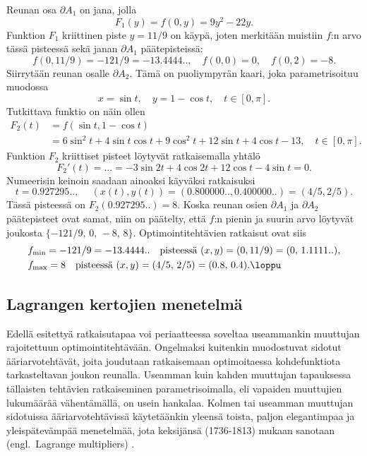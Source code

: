 Reunan osa $\partial A_1$ on jana, jolla
\[ 
F_1(y) = f(0,y) = 9y^2-22y. 
\]
Funktion $F_1$ kriittinen piste $y=11/9$ on käypä, joten merkitään muistiin $f$:n arvo tässä 
pisteessä sekä janan $\partial A_1$ päätepisteissä:
\[
f(0,11/9) = -121/9 = -13.4444.., \quad f(0,0)=0, \quad f(0,2) = -8. 
\]
Siirrytään reunan osalle $\partial A_2$. Tämä on puoliympyrän kaari, joka parametrisoituu 
muodossa
\[ 
x = \sin t, \quad y=1-\cos t, \quad t \in [0,\pi]. 
\]
Tutkittava funktio on näin ollen
\begin{align*}
 F_2(t) &= f(\sin t,1-\cos t) \\
        &= 6\sin^2t+4\sin t\cos t+9\cos^2 t+12\sin t+4\cos t-13, \quad t \in [0,\pi].
\end{align*}
Funktion $F_2$ kriittiset pisteet löytyvät ratkaisemalla yhtälö
\[ 
F_2'(t)= \ldots = -3\sin 2t + 4\cos 2t + 12\cos t - 4\sin t = 0. 
\]
Numeerisin keinoin saadaan ainoaksi käyväksi ratkaisuksi
\[ 
t = 0.927295 .., \quad\ (x(t),y(t)) = (0.800000..,0.400000..) = (4/5,2/5). 
\]
Tässä pisteessä on $F_2(0.927295..) = 8$. Koska reunan osien $\partial A_1$ ja $\partial A_2$
päätepisteet ovat samat, niin on päätelty, että $f$:n pienin ja suurin arvo löytyvät joukosta
$\{-121/9,\,0,\,-8,\,8\}$. Optimointitehtävien ratkaisut ovat siis
\begin{align*}
&f_{\text{min}} = -121/9 = -13.4444.. \quad 
                               \text{pisteessä}\ (x,y) = (0,11/9) = (0,\,1.1111..), \\
&f_{\text{max}} = 8 \quad \text{pisteessä}\ (x,y) = (4/5,\,2/5) = (0.8,\,0.4). \loppu
\end{align*}

\subsection{Lagrangen kertojien menetelmä}

Edellä esitettyä ratkaisutapaa voi periaatteessa soveltaa useammankin muuttujan rajoitettuun
optimointitehtävään. Ongelmaksi kuitenkin muodostuvat sidotut ääriarvotehtävät, joita joudutaan
ratkaisemaan optimoitaessa kohdefunktiota tarkasteltavan joukon reunalla. Useamman kuin kahden
muuttujan tapauksessa tällaisten tehtävien ratkaiseminen parametrisoimalla, eli vapaiden
muuttujien lukumäärää vähentämällä, on usein hankalaa. Kolmen tai useamman muuttujan sidotuissa 
ääriarvotehtävissä käytetäänkin yleensä toista, paljon elegantimpaa ja yleispätevämpää
menetelmää, jota keksijänsä  (1736-1813) mukaan sanotaan 
 (engl.\ Lagrange multipliers) . 

